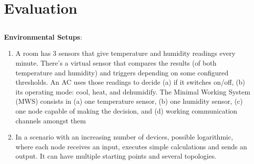 \chapter{Evaluation} \label{chap:evaluation} \minitoc

\section*{}

\textbf{Environmental Setups}:
\begin{enumerate}
    \item A room has 3 sensors that give temperature and humidity readings every minute. There’s a virtual sensor that compares the results (of both temperature and humidity) and triggers depending on some configured thresholds. An AC uses those readings to decide (a) if it switches on/off, (b) its operating mode: cool, heat, and dehumidify. The Minimal Working System (MWS) consists in (a) one temperature sensor, (b) one humidity sensor, (c) one node capable of making the decision, and (d) working communication channels amongst them
    \item In a scenario with an increasing number of devices, possible logarithmic, where each node receives an input, executes simple calculations and sends an output. It can have multiple starting points and several topologies.
\end{enumerate}

